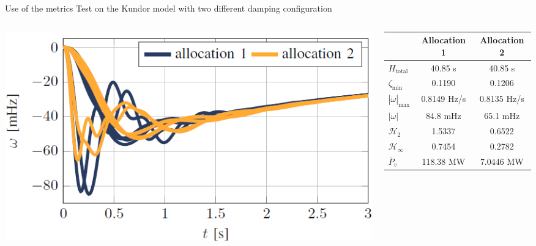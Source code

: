 \documentclass[aspectratio=169, 12pt]{beamer}
\begin{document}
\begin{frame}{Use of the metrics}
  Test on the Kundor model with two different damping configuration
  \begin{columns}
    \begin{column}{0.5\columnwidth}
      \includegraphics[width = \columnwidth]{figure/kundor_frequency.png}
    \end{column}
    \begin{column}{0.5\columnwidth}
      \begin{table}[h!]
        \centering
        \begin{tabular}{lcc}
        \toprule
        & Allocation 1 & Allocation 2 \\
        \midrule
        $H_{\text{total}}$ & 40.85 s & 40.85 s \\
        $\zeta_{\text{min}}$ & 0.1190 & 0.1206 \\
        $\left|\dot{\omega}\right|_{\max}$ & 0.8149 Hz/s & 0.8135 Hz/s \\
        $\left|\omega\right|$ & 84.8 mHz & 65.1 mHz \\
        $\mathcal{H}_2 $ & 1.5337 & 0.6522 \\
        $\mathcal{H}_{\infty} $ & 0.7454 & 0.2782 \\
        $\overline{P}_v$ & 118.38 MW & 7.0446 MW \\
        \bottomrule
        \end{tabular}
      
        \label{table:allocations}
        \end{table}
    \end{column}
  \end{columns}
\end{frame}
\end{document}
